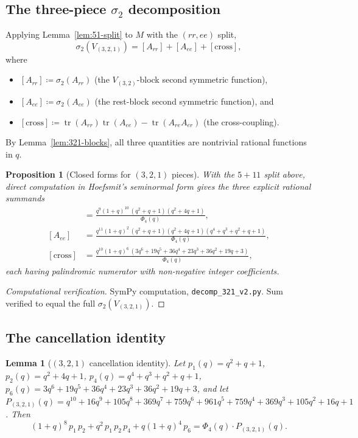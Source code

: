 \documentclass[11pt]{article}
\theoremstyle{plain}
\newtheorem{lemma}[theorem]{Lemma}
\newtheorem{proposition}[theorem]{Proposition}
\theoremstyle{definition}
\theoremstyle{remark}
\newcommand{\trace}{\operatorname{tr}}
\begin{document}
\subsection{The three-piece $\sigma_2$ decomposition}

Applying Lemma~\ref{lem:51-split} to $M$ with the $(rr,ee)$ split,
\begin{equation}\label{eq:321-three-pieces}
  \sigma_2(V_{(3,2,1)}) = [A_{rr}] + [A_{ee}] + [\mathrm{cross}],
\end{equation}
where
\begin{itemize}[itemsep=0pt]
\item $[A_{rr}] \coloneqq \sigma_2(A_{rr})$ (the $V_{(3,2)}$-block second symmetric function),
\item $[A_{ee}] \coloneqq \sigma_2(A_{ee})$ (the rest-block second symmetric function), and
\item $[\mathrm{cross}] \coloneqq \trace(A_{rr})\trace(A_{ee}) - \trace(A_{re}A_{er})$ (the cross-coupling).
\end{itemize}
By Lemma~\ref{lem:321-blocks}, all three quantities are nontrivial
rational functions in $q$.

\begin{proposition}[Closed forms for $(3,2,1)$ pieces]\label{prop:321-closed}
With the $5+11$ split above, direct computation in Hoefsmit's seminormal
form gives the three explicit rational summands
\begin{align*}
  [A_{rr}] &= \frac{q^9 (1+q)^{10} \,(q^2+q+1)(q^2+4q+1)}{\Phi_4(q)}, \\
  [A_{ee}] &= \frac{q^{11} (1+q)^2 \,(q^2+q+1)(q^2+4q+1)(q^4+q^3+q^2+q+1)}{\Phi_4(q)}, \\
  [\mathrm{cross}] &= \frac{q^{10} (1+q)^6 \,(3q^6+19q^5+36q^4+23q^3+36q^2+19q+3)}{\Phi_4(q)},
\end{align*}
each having palindromic numerator with non-negative integer coefficients.
\end{proposition}

\begin{proof}[Computational verification]
SymPy computation, \verb|decomp_321_v2.py|. Sum verified to equal the full
$\sigma_2(V_{(3,2,1)})$.
\end{proof}

\subsection{The cancellation identity}

\begin{lemma}[$(3,2,1)$ cancellation identity]\label{lem:identity-321}
Let $p_1(q) = q^2+q+1$, $p_2(q) = q^2+4q+1$, $p_4(q) = q^4+q^3+q^2+q+1$,
$p_6(q) = 3q^6+19q^5+36q^4+23q^3+36q^2+19q+3$, and let
$P_{(3,2,1)}(q) = q^{10} + 16q^9 + 105q^8 + 369q^7 + 759q^6 + 961q^5 + 759q^4 + 369q^3 + 105q^2 + 16q + 1$.
Then
\begin{equation}\label{eq:identity-321}
  (1+q)^8 \,p_1\,p_2 + q^2\, p_1\,p_2\,p_4 + q (1+q)^4 \,p_6
    = \Phi_4(q) \cdot P_{(3,2,1)}(q).
\end{equation}
\end{lemma}
\end{document}
